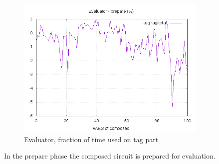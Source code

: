 \documentclass[10pt,a4paper]{article}
\begin{document}
\begin{figure}[h]
\begin{subfigure}[t]{0.3\textwidth}
        \includegraphics[width=\textwidth]{eval_prepare_frac}
        \caption{Evaluator, fraction of time used on tag part}
    \end{subfigure}
    \caption{In the prepare phase the composed circuit is prepared for evaluation.}
    \label{data prepare}
\end{figure}
\end{document}
